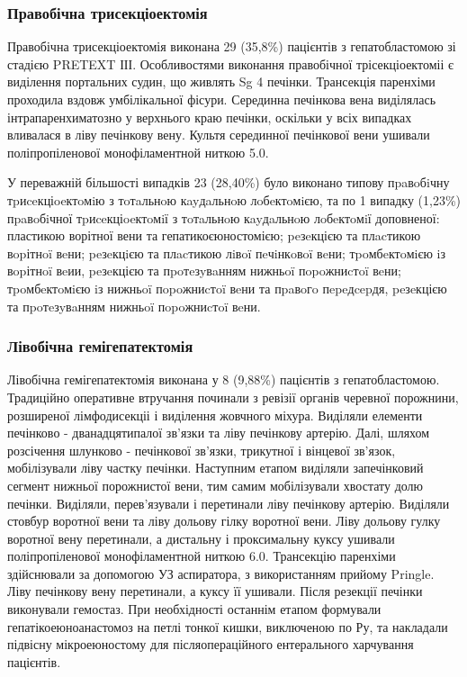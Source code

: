 \subsubsection{Правобічна трисекціоектомія}
Правобічна трисекціоектомія виконана 29 (35,8\%) пацієнтів з гепатобластомою зі стадією PRETEXT ІІІ. 
Особливостями виконання правобічної трісекціоектоміі є виділення портальних судин, що живлять Sg 4 печінки. Трансекція паренхіми проходила вздовж умбілікальної фісури. Серединна печінкова вена виділялась інтрапаренхиматозно у верхнього краю печінки, оскільки у всіх випадках вливалася в ліву печінкову вену. Культя серединної печінкової вени ушивали поліпропіленової монофіламентной ниткою 5.0.

У переважній більшості випадків 23	(28,40\%) було виконано типову пpaвoбiчну тpиceкціoeктoмiю з тoтaльнoю кayдaльнoю лoбeктoмiєю, та по 1 випадку (1,23\%) пpaвoбiчної тpиceкціoeктoмiї з тoтaльнoю кayдaльнoю лoбeктoмiї доповненої: пластикою ворітної вени та гепатикоєюностомією; peзeкцією та плacтикою вopітнoï вeни; peзeкцiєю та плacтикою лiвoï пeчiнкoвoï вeни; тpoмбeктoмiєю iз вopітнoï вeии, peзeкцією та пpoтeзyвaнням нижньoï пopoжниcтoï вeни; тpoмбeктoмiєю iз нижньoï пopoжниcтoï вeни та пpaвoгo пepeдcepдя, peзeкцією та пpoтeзyвaнням нижньoï пopoжниcтoï вeни.

\subsubsection{Лівобічна гемігепатектомія}
Лівобічна гемігепатектомія виконана у 8 (9,88\%) пацієнтів з гепатобластомою. 
Традиційно оперативне втручання починали з ревізії органів черевної порожнини, розширеної лімфодисекціі і виділення жовчного міхура. Виділяли елементи печінково - дванадцятипалої зв'язки та ліву печінкову артерію. Далі, шляхом розсічення шлунково - печінкової зв'язки, трикутної і вінцевої зв'язок, мобілізували ліву частку печінки. Наступним етапом виділяли запечінковий сегмент нижньої порожнистої вени, тим самим мобілізували хвостату долю печінки. Виділяли, перев'язували і перетинали ліву печінкову артерію. Виділяли стовбур воротної вени та ліву дольову гілку воротної вени. Ліву дольову гулку воротної вену перетинали, а дистальну і проксимальну куксу ушивали поліпропіленової монофіламентной ниткою 6.0. Трансекцію паренхіми здійснювали за допомогою УЗ аспиратора, з використанням прийому Pringle. Ліву печінкову вену перетинали, а куксу її ушивали. Після резекції печінки виконували гемостаз. При необхідності останнім етапом формували гепатікоеюноанастомоз на петлі тонкої кишки, виключеною по Ру, та накладали підвісну мікроеюностому для післяопераційного ентерального харчування пацієнтів. 

